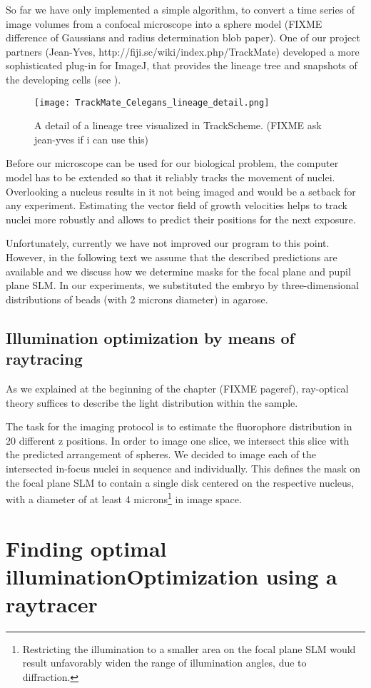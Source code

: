 So far we have only implemented a simple algorithm, to convert a time
series of image volumes from a confocal microscope into a sphere model
(FIXME difference of Gaussians and radius determination blob paper).
One of our project partners (Jean-Yves,
http://fiji.sc/wiki/index.php/TrackMate) developed a more
sophisticated plug-in for ImageJ, that provides the lineage tree and
snapshots of the developing cells (see ).
\begin{figure}[!hbt]
  \centering
  \texttt{[image: TrackMate\_Celegans\_lineage\_detail.png]}
  \caption{ A detail of a lineage tree visualized in
    TrackScheme. (FIXME ask jean-yves if i can use this)}
  \label{fig:trackmate}
\end{figure}
Before our microscope can be used for our biological problem, the
computer model has to be extended so that it reliably tracks the
movement of nuclei.  Overlooking a nucleus results in it not being
imaged and would be a setback for any experiment.  Estimating the
vector field of growth velocities helps to track nuclei more robustly
and allows to predict their positions for the next exposure.


Unfortunately, currently we have not improved our program to this
point. However, in the following text we assume that the described
predictions are available and we discuss how we determine masks for
the focal plane and pupil plane SLM.  In our experiments, we
substituted the embryo by three-dimensional distributions of beads
(with 2 microns diameter) in agarose.

\subsection{Illumination optimization by means of raytracing}
As we explained at the beginning of the chapter (FIXME pageref),
ray-optical theory suffices to describe the light distribution within
the sample.

The task for the imaging protocol is to estimate the fluorophore
distribution in 20 different z positions. In order to image one slice,
we intersect this slice with the predicted arrangement of spheres. We
decided to image each of the intersected in-focus nuclei in sequence
and individually. This defines the mask on the focal plane SLM to
contain a single disk centered on the respective nucleus, with a
diameter of at least 4 microns\footnote{Restricting the illumination
  to a smaller area on the focal plane SLM would result unfavorably
  widen the range of illumination angles, due to diffraction.} in
image space.


\section{Finding optimal illuminationOptimization using a raytracer}
